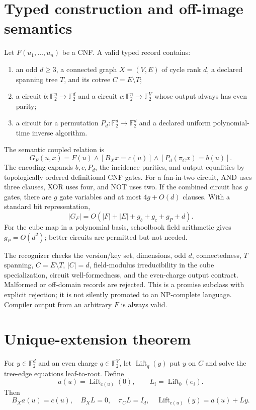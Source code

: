 \documentclass[11pt]{article}
\newcommand{\F}{\mathbb F_2}
\begin{document}
\section{Typed construction and off-image semantics}
Let $F(u_1,\ldots,u_n)$ be a CNF.  A valid typed record contains:
\begin{enumerate}
\item an odd $d\ge3$, a connected graph $X=(V,E)$ of cycle rank $d$, a
declared spanning tree $T$, and its cotree $C=E\setminus T$;
\item a circuit $b:\F^n\to\F^d$ and a circuit
$c:\F^n\to\F^V$ whose output always has even parity;
\item a circuit for a permutation $P_d:\F^d\to\F^d$ and a declared uniform
polynomial-time inverse algorithm.
\end{enumerate}
The semantic coupled relation is
\[
 G_F(u,x)=F(u)\land[B_Xx=c(u)]
             \land[P_d(\pi_Cx)=b(u)].                 \tag{1}
\]
The encoding expands $b,c,P_d$, the incidence parities, and output equalities
by topologically ordered definitional CNF gates.  For a fan-in-two circuit,
AND uses three clauses, XOR uses four, and NOT uses two.  If the combined
circuit has $g$ gates, there are $g$ gate variables and at most $4g+O(d)$
clauses.  With a standard bit representation,
\[
 |G_F|=O(|F|+|E|+g_b+g_c+g_P+d).                       \tag{2}
\]
For the cube map in a polynomial basis, schoolbook field arithmetic gives
$g_P=O(d^2)$; better circuits are permitted but not needed.

The recognizer checks the version/key set, dimensions, odd $d$, connectedness,
$T$ spanning, $C=E\setminus T$, $|C|=d$, field-modulus irreducibility in the
cube specialization, circuit well-formedness, and the even-charge output
contract.  Malformed or off-domain records are rejected.  This is a promise
subclass with explicit rejection; it is not silently promoted to an
NP-complete language.  Compiler output from an arbitrary $F$ is always valid.

\section{Unique-extension theorem}
For $y\in\F^d$ and an even charge $q\in\F^V$, let
$\operatorname{Lift}_q(y)$ put $y$ on $C$ and solve the tree-edge equations
leaf-to-root.  Define
\[
 a(u)=\operatorname{Lift}_{c(u)}(0),\qquad
 L_i=\operatorname{Lift}_0(e_i).                       \tag{3}
\]
Then
\[
 B_Xa(u)=c(u),\quad B_XL=0,\quad\pi_CL=I_d,
 \quad\operatorname{Lift}_{c(u)}(y)=a(u)+Ly.           \tag{4}
\]
\end{document}
